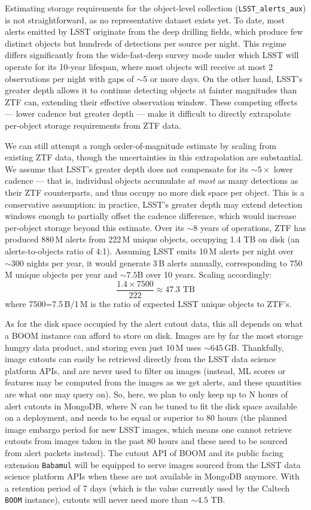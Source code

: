 \documentclass[twocolumn]{aastex631}
\begin{document}
Estimating storage requirements for the object-level collection (\texttt{LSST\_alerts\_aux}) is not straightforward, as no representative dataset exists yet. To date, most alerts emitted by LSST originate from the deep drilling fields, which produce few distinct objects but hundreds of detections per source per night. This regime differs significantly from the wide-fast-deep survey mode under which LSST will operate for its 10-year lifespan, where most objects will receive at most 2 observations per night with gaps of $\sim$5 or more days. On the other hand, LSST's greater depth allows it to continue detecting objects at fainter magnitudes than ZTF can, extending their effective observation window. These competing effects — lower cadence but greater depth — make it difficult to directly extrapolate per-object storage requirements from ZTF data.

We can still attempt a rough order-of-magnitude estimate by scaling from existing ZTF data, though the uncertainties in this extrapolation are substantial. We assume that LSST's greater depth does not compensate for its $\sim5\times$ lower cadence — that is, individual objects accumulate \emph{at most} as many detections as their ZTF counterparts, and thus occupy no more disk space per object. This is a conservative assumption: in practice, LSST's greater depth may extend detection windows enough to partially offset the cadence difference, which would increase per-object storage beyond this estimate. Over its $\sim$8 years of operations, ZTF has produced 880\,M alerts from 222\,M unique objects, occupying 1.4 TB on disk (an alerts-to-objects ratio of 4:1). Assuming LSST emits 10\,M alerts per night over $\sim 300$ nights per year, it would generate 3\,B alerts annually, corresponding to 750\,M unique objects per year and $\sim7.5$B over 10 years. Scaling accordingly:
\[
\frac{1.4 \times 7500}{222} \approx 47.3 \text{ TB}
\]
where 7500=7.5\,B/1\,M is the ratio of expected LSST unique objects to ZTF's.

As for the disk space occupied by the alert cutout data, this all depends on what a BOOM instance can afford to store on disk. Images are by far the most storage hungry data product, and storing even just 10\,M uses $\sim 645$\,GB. Thankfully, image cutouts can easily be retrieved directly from the LSST data science platform APIs, and are never used to filter on images (instead, ML scores or features may be computed from the images as we get alerts, and these quantities are what one may query on). So, here, we plan to only keep up to N hours of alert cutouts in MongoDB, where N can be tuned to fit the disk space available on a deployment, and needs to be equal or superior to 80 hours (the planned image embargo period for new LSST images, which means one cannot retrieve cutouts from images taken in the past 80 hours and these need to be sourced from alert packets instead). The cutout API of BOOM and its public facing extension \texttt{Babamul} will be equipped to serve images sourced from the LSST data science platform APIs when these are not available in MongoDB anymore. With a retention period of 7 days (which is the value currently used by the Caltech \texttt{BOOM} instance), cutouts will never need more than $\sim 4.5$ TB.
\end{document}
